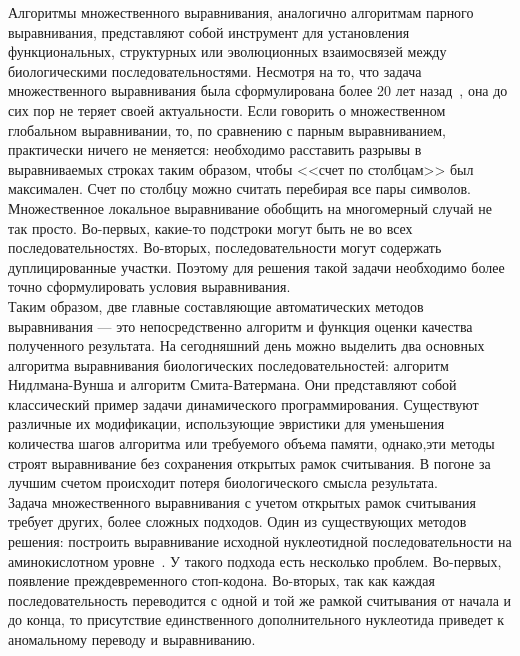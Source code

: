 \indent Алгоритмы множественного выравнивания, аналогично алгоритмам парного выравнивания, представляют собой инструмент для установления функциональных, структурных или эволюционных взаимосвязей между биологическими последовательностями.  Несмотря на то, что задача множественного выравнивания была сформулирована более 20 лет назад~\cite{SIAM_Journal}, она до сих пор не теряет своей актуальности. Если говорить о множественном глобальном выравнивании, то, по сравнению с парным выравниванием, практически ничего не меняется: необходимо расставить разрывы в выравниваемых строках таким образом, чтобы <<счет по столбцам>> был максимален. Счет по столбцу можно считать перебирая все пары символов. Множественное локальное выравнивание обобщить на многомерный случай не так просто. Во-первых, какие-то подстроки могут быть не во всех последовательностях. Во-вторых, последовательности могут содержать дуплицированные участки. Поэтому для решения такой задачи необходимо более точно сформулировать условия выравнивания.\\ 
\indent Таким образом, две главные составляющие автоматических методов выравнивания --- это непосредственно алгоритм и функция оценки качества полученного результата. На сегодняшний день можно выделить два основных алгоритма выравнивания биологических последовательностей: алгоритм Нидлмана-Вунша и алгоритм Смита-Ватермана. Они представляют собой классический пример задачи динамического программирования. Существуют различные их модификации, использующие эвристики для уменьшения количества шагов алгоритма или требуемого объема памяти, однако,эти методы строят выравнивание без сохранения открытых рамок считывания. В погоне за лучшим счетом происходит потеря биологического смысла результата.\\ 
\indent Задача множественного выравнивания с учетом открытых рамок считывания требует других, более сложных подходов. Один из существующих методов решения: построить выравнивание исходной нуклеотидной последовательности на аминокислотном уровне~\cite{MACSE}. У такого подхода есть несколько проблем. Во-первых, появление преждевременного стоп-кодона. Во-вторых, так как каждая последовательность переводится с одной и той же рамкой считывания от начала и до конца, то присутствие единственного дополнительного нуклеотида приведет к аномальному переводу и выравниванию.